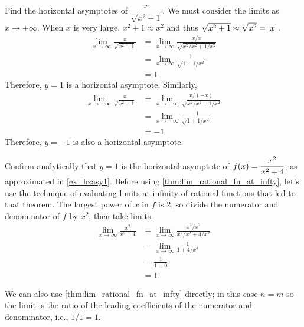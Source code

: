 \begin{example}\label{ex_sqrt_asy}%
Find the horizontal asymptotes of $\dfrac{x}{\sqrt{x^2+1}}$.
\solution We must consider the limits as $x\to \pm \infty$. When $x$ is very large, $x^2+1\approx x^2$ and thus $\sqrt{x^2+1}\approx \sqrt{x^2}=\left\lvert x \right\rvert$.
\begin{align*}
\lim_{x\to\infty}\frac{x}{\sqrt{x^2+1}}
&=\lim_{x\to\infty}\frac{x/x}{\sqrt{x^2/{x^2}+1/{x^2}}}\\
&=\lim_{x\to\infty}\frac{1}{\sqrt{1+1/{x^2}}}\\
&=1
\end{align*}
Therefore, $y=1$ is a horizontal asymptote.
Similarly, 
\begin{align*}
\lim_{x\to-\infty}\frac{x}{\sqrt{x^2+1}}
&=\lim_{x\to-\infty}\frac{x/(-x)}{\sqrt{x^2/{x^2}+1/{x^2}}}\\
&=\lim_{x\to-\infty}\frac{-1}{\sqrt{1+1/{x^2}}}\\
&=-1
\end{align*}
Therefore, $y=-1$ is also a horizontal asymptote.
\end{example}

\begin{example}\label{ex_hzasy2}%
Confirm analytically that $y=1$ is the horizontal asymptote of $\displaystyle f(x) = \frac{x^2}{x^2+4}$, as approximated in \autoref{ex_hzasy1}.
\solution
Before using \autoref{thm:lim_rational_fn_at_infty}, let's use the technique of evaluating limits at infinity of rational functions that led to that theorem. The largest power of $x$ in $f$ is 2, so divide the numerator and denominator of $f$ by $x^2$, then take limits.\vspace{-.3\baselineskip}
\begin{align*}
	\lim_{x\to\infty}\frac{x^2}{x^2+4}
	&= \lim_{x\to\infty}\frac{x^2/x^2}{x^2/x^2+4/x^2}\\
	&= \lim_{x\to\infty}\frac{1}{1+4/x^2}\\
	&= \frac1{1+0}\\
	&= 1.
\end{align*}

We can also use \autoref{thm:lim_rational_fn_at_infty} directly; in this case $n=m$ so the limit is the ratio of the leading coefficients of the numerator and denominator, i.e., $1/1=1$.
\end{example}

